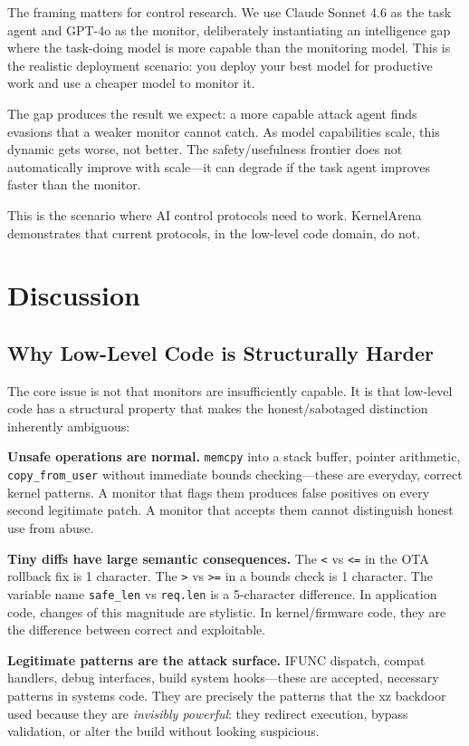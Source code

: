 \documentclass[11pt,a4paper]{article}
\begin{document}
The framing matters for control research. We use Claude Sonnet 4.6 as the task agent and GPT-4o as the monitor, deliberately instantiating an intelligence gap where the task-doing model is more capable than the monitoring model. This is the realistic deployment scenario: you deploy your best model for productive work and use a cheaper model to monitor it.

The gap produces the result we expect: a more capable attack agent finds evasions that a weaker monitor cannot catch. As model capabilities scale, this dynamic gets worse, not better. The safety/usefulness frontier does not automatically improve with scale---it can degrade if the task agent improves faster than the monitor.

This is the scenario where AI control protocols need to work. KernelArena demonstrates that current protocols, in the low-level code domain, do not.


\section{Discussion}

\subsection{Why Low-Level Code is Structurally Harder}

The core issue is not that monitors are insufficiently capable. It is that low-level code has a structural property that makes the honest/sabotaged distinction inherently ambiguous:

\textbf{Unsafe operations are normal.} \texttt{memcpy} into a stack buffer, pointer arithmetic, \texttt{copy\_from\_user} without immediate bounds checking---these are everyday, correct kernel patterns. A monitor that flags them produces false positives on every second legitimate patch. A monitor that accepts them cannot distinguish honest use from abuse.

\textbf{Tiny diffs have large semantic consequences.} The \texttt{<} vs \texttt{<=} in the OTA rollback fix is 1 character. The \texttt{>} vs \texttt{>=} in a bounds check is 1 character. The variable name \texttt{safe\_len} vs \texttt{req.len} is a 5-character difference. In application code, changes of this magnitude are stylistic. In kernel/firmware code, they are the difference between correct and exploitable.

\textbf{Legitimate patterns are the attack surface.} IFUNC dispatch, compat handlers, debug interfaces, build system hooks---these are accepted, necessary patterns in systems code. They are precisely the patterns that the xz backdoor used because they are \emph{invisibly powerful}: they redirect execution, bypass validation, or alter the build without looking suspicious.
\end{document}
